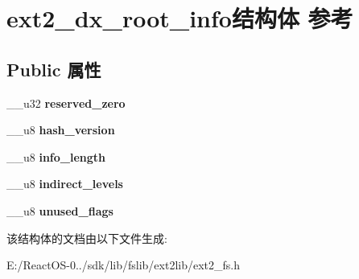 \hypertarget{structext2__dx__root__info}{}\section{ext2\+\_\+dx\+\_\+root\+\_\+info结构体 参考}
\label{structext2__dx__root__info}
\subsection*{Public 属性}
\begin{DoxyCompactItemize}
\item 
\mbox{\label{structext2__dx__root__info_aeef87b8afa6e7321121c58d5e08e70d7}} 
\+\_\+\+\_\+u32 {\bfseries reserved\+\_\+zero}
\item 
\mbox{\label{structext2__dx__root__info_a2ae2902e18ef4512b42500f9f419b30b}} 
\+\_\+\+\_\+u8 {\bfseries hash\+\_\+version}
\item 
\mbox{\label{structext2__dx__root__info_a116446925fe6cc0e759bcd4e7e0d2c61}} 
\+\_\+\+\_\+u8 {\bfseries info\+\_\+length}
\item 
\mbox{\label{structext2__dx__root__info_adf687198abdc7f7742336f09d24da97f}} 
\+\_\+\+\_\+u8 {\bfseries indirect\+\_\+levels}
\item 
\mbox{\label{structext2__dx__root__info_a0e9e9c303a282eee8404cc86166b902a}} 
\+\_\+\+\_\+u8 {\bfseries unused\+\_\+flags}
\end{DoxyCompactItemize}


该结构体的文档由以下文件生成\+:\begin{DoxyCompactItemize}
\item 
E\+:/\+React\+O\+S-\/0../sdk/lib/fslib/ext2lib/ext2\+\_\+fs.\+h\end{DoxyCompactItemize}

